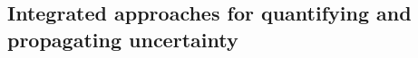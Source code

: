 \documentclass{article}
\begin{document}
\subsection*{Integrated approaches for quantifying and propagating uncertainty} 
\end{document}
